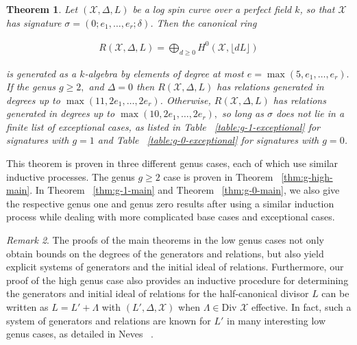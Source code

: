 \documentclass{amsart}
\theoremstyle{plain}
\newtheorem{thm}{Theorem}[section]
\theoremstyle{definition}
\theoremstyle{remark}
\newtheorem{rem}[thm]{Remark}
\numberwithin{equation}{section}
\newcommand \sx{\mathscr X}
\newcommand \di{\text{Div }}
\newcommand \halfcan{L}
\begin{document}
\begin{thm}
\label{thm:main}
Let $(\sx, \Delta, \halfcan)$ be a log spin curve over a perfect field $k$,  so
that $\sx$ has signature $\sigma = (0; e_1, \ldots, e_r; \delta)$. Then the
canonical ring

\begin{align*}
	R(\sx, \Delta, \halfcan) = \bigoplus_{d \geq 0} H^0(\sx, \lfloor d L \rfloor)
\end{align*}

\noindent
is generated as a $k$-algebra by elements of degree at most $e =
\max(5, e_1, \ldots, e_r).$ If the genus $g \geq 2,$ and $\Delta = 0
$ then $R(\sx,\Delta, \halfcan)$ has relations generated in degrees
up to $\max(11, 2e_1, \ldots, 2e_r)$. Otherwise, $R(\sx, \Delta,
\halfcan)$ has relations generated in degrees up to $\max(10, 2e_1,
\ldots, 2e_r),$ so long as $\sigma$ does not lie in a finite list
of exceptional cases, as listed in Table ~\ref{table:g-1-exceptional}
for signatures with $g = 1$ and Table ~\ref{table:g-0-exceptional}
for signatures with $g = 0$.
\end{thm}

This theorem is proven in three different genus cases, each of
which use similar inductive processes. The genus $g \geq 2$ case is
proven in Theorem ~\ref{thm:g-high-main}. In Theorem
~\ref{thm:g-1-main} and Theorem
~\ref{thm:g-0-main}, we also give the respective
genus one and genus zero results after using a similar induction
process while dealing with more complicated base cases and
exceptional cases.

\begin{rem}
\label{rem:explicit-generators}
The proofs of the main theorems in the low genus cases not only
obtain bounds on the degrees of the generators and relations, but
also yield explicit systems of generators and the initial ideal of
relations. Furthermore, our proof of the high genus case also
provides an inductive procedure for determining the generators and
initial ideal of relations for the half-canonical divisor $\halfcan$ can be written as $\halfcan = \halfcan' + \Lambda$ with
$(\halfcan', \Delta, \sx)$ when $\Lambda \in \di \sx$ effective. In fact, such a system of
generators and relations are known for $\halfcan'$ in many interesting low genus cases,
as detailed in Neves ~\cite[ Section III.4]{neves:halfcan}.
\end{rem}
\end{document}
